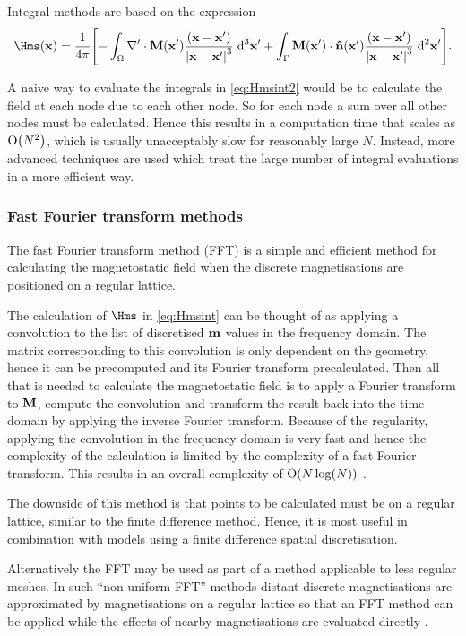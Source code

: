 Integral methods are based on the expression
\begin{equation}
  \Hms(\xv) = \frac{1}{4 \pi} \bigs{
    - \int_\magd \nabla' \cdot \Mv(\xv') \frac{(\xv - \xv')}{\abs{\xv -\xv'}^3} \d^3 \xv'
    + \int_\boundd \Mv(\xv') \cdot \nv(\xv') \frac{(\xv - \xv')}{\abs{\xv - \xv'}^3} \d^2 \xv' }.
  \label{eq:Hmsint2}
\end{equation}

A naive way to evaluate the integrals in \cref{eq:Hmsint2} would be to calculate the field at each node due to each other node.
So for each node a sum over all other nodes must be calculated.
Hence this results in a computation time that scales as $\mathrm{O}{\left( N^2 \right)}$, which is usually unacceptably slow for reasonably large $N$.
Instead, more advanced techniques are used which treat the large number of integral evaluations in a more efficient way.


\subsubsection{Fast Fourier transform methods}

The fast Fourier transform method (FFT) is a simple and efficient method for calculating the magnetostatic field when the discrete magnetisations are positioned on a regular lattice.

The calculation of $\Hms$ in \cref{eq:Hmsint} can be thought of as applying a convolution to the list of discretised $\boldsymbol{\mathrm{m}}$ values in the frequency domain.
The matrix corresponding to this convolution is only dependent on the geometry, hence it can be precomputed and its Fourier transform precalculated.
Then all that is needed to calculate the magnetostatic field is to apply a Fourier transform to $\boldsymbol{\mathrm{M}}$, compute the convolution and transform the result back into the time domain by applying the inverse Fourier transform.
Because of the regularity, applying the convolution in the frequency domain is very fast and hence the complexity of the calculation is limited by the complexity of a fast Fourier transform.
This results in an overall complexity of $\mathrm{O}{\left( N \log(N) \right)}$ \cite{Jones1997}.

The downside of this method is that points to be calculated must be on a regular lattice, similar to the finite difference method.
Hence, it is most useful in combination with models using a finite difference spatial discretisation.

Alternatively the FFT may be used as part of a method applicable to less regular meshes.
In such ``non-uniform FFT'' methods distant discrete magnetisations are approximated by magnetisations on a regular lattice so that an FFT method can be applied while the effects of nearby magnetisations are evaluated directly \cite{Jones1997}.


